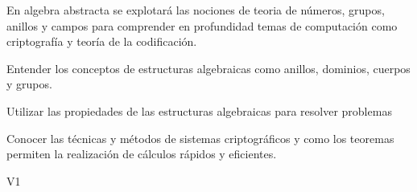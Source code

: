 \begin{syllabus}


\begin{justification}
En algebra abstracta se explotará las nociones de teoria de números, grupos, anillos y campos para comprender en profundidad temas de computación como criptografía y teoría de la codificación.
\end{justification}

\begin{goals}
	\item Entender los conceptos de estructuras algebraicas como anillos, dominios, cuerpos y grupos.
	\item Utilizar las propiedades de las estructuras algebraicas para resolver problemas  
	\item  Conocer las técnicas y métodos de sistemas criptográficos y como los teoremas permiten la realización de cálculos rápidos y eficientes.
\end{goals}
\begin{outcomes}{V1}
    \item {}
    \item {}
    \item {}
 \end{outcomes}

\begin{competences}
    \item {}
    \item {}
    \item {}
    \item {}
\end{competences}


\end{syllabus}

